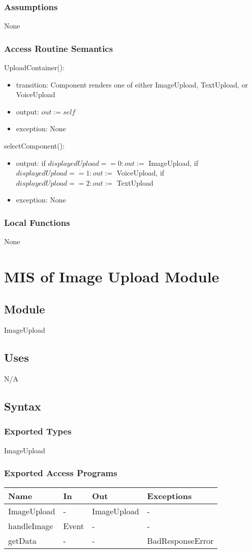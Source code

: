 \documentclass[12pt, titlepage]{article}
\begin{document}
\subsubsection{Assumptions}
None
\subsubsection{Access Routine Semantics}
\noindent UploadContainer():
\begin{itemize}
	\item transition: Component renders one of either ImageUpload, TextUpload, 
	or VoiceUpload
	\item output: $out := self$
	\item exception: None
\end{itemize}

\noindent selectComponent():
\begin{itemize}
	\item output: if $displayedUpload == 0: out := $ ImageUpload, if 
	$displayedUpload == 1: out := $ VoiceUpload, if $displayedUpload == 2: out 
	:= $ TextUpload
	\item exception: None
\end{itemize}
\subsubsection{Local Functions}
None

\newpage

\section{MIS of Image Upload Module} \label{ImageUpload} 
\subsection{Module}
ImageUpload
\subsection{Uses}
N/A
\subsection{Syntax}
\subsubsection{Exported Types}
ImageUpload
\subsubsection{Exported Access Programs}
\begin{center}
	\begin{tabular}{p{3cm} p{4cm} p{4cm} p{3cm}}
		\hline
		\textbf{Name} & \textbf{In} & \textbf{Out} & \textbf{Exceptions} \\
		\hline
		ImageUpload & - & ImageUpload &- \\
		handleImage & Event & - & - \\
		getData & - & - & BadResponseError \\
		\hline
	\end{tabular}
\end{center}
\end{document}
